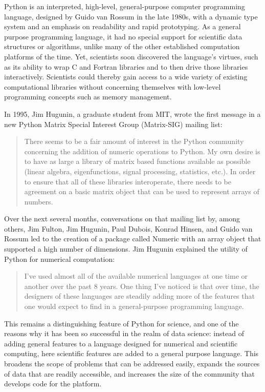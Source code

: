 \documentclass[fleqn,10pt]{wlscirep}
\begin{document}
Python is an interpreted, high-level, general-purpose computer programming
language, designed by Guido van Rossum in the late 1980s,
with a dynamic type system and an emphasis on readability and rapid prototyping\cite{cpython-refman,cpython-source}.
%
As a general purpose programming language, it had no special support for
scientific data structures or algorithms, unlike many of the other established
computation platforms of the time. Yet, scientists soon discovered the
language's virtues, such as its ability to wrap C and Fortran
libraries and to then drive those libraries interactively.  Scientists
could thereby gain access to a wide variety of existing computational
libraries without concerning themselves with low-level programming
concepts such as memory management.

In 1995, Jim Hugunin, a graduate student from MIT, wrote the first
message in a new Python Matrix Special Interest Group (Matrix-SIG)
mailing list\cite{Hugunin-first}:
\begin{quote}
There seems to be a fair amount of interest in the Python community
concerning the addition of numeric operations to Python.  My own desire is
to have as large a library of matrix based functions available as possible
(linear algebra, eigenfunctions, signal processing, statistics, etc.).  In
order to ensure that all of these libraries interoperate, there needs to
be agreement on a basic matrix object that can be used to represent arrays
of numbers.
\end{quote}
Over the next several months, conversations on that mailing
list by, among others, Jim Fulton, Jim Hugunin, Paul Dubois, Konrad
Hinsen, and Guido van Rossum led to the creation of a package called Numeric with an array object
that supported a high number of dimensions.  Jim Hugunin explained the utility
of Python for numerical computation\cite{Hugunin-whitepaper}:
\begin{quote}
I've used almost all of the available numerical languages at one time
or another over the past 8 years. One thing I've noticed is that over
time, the designers of these languages are steadily adding more of the
features that one would expect to find in a general-purpose
programming language.
\end{quote}
This remains a distinguishing feature of Python for science, and one of the
reasons why it has been so successful in the realm of data science: instead of
adding general features to a language designed for numerical and scientific
computing, here scientific features are added to a general purpose language.
This broadens the scope of problems that can be addressed easily, expands the
sources of data that are readily accessible, and increases the size of the
community that develops code for the platform.
\end{document}
